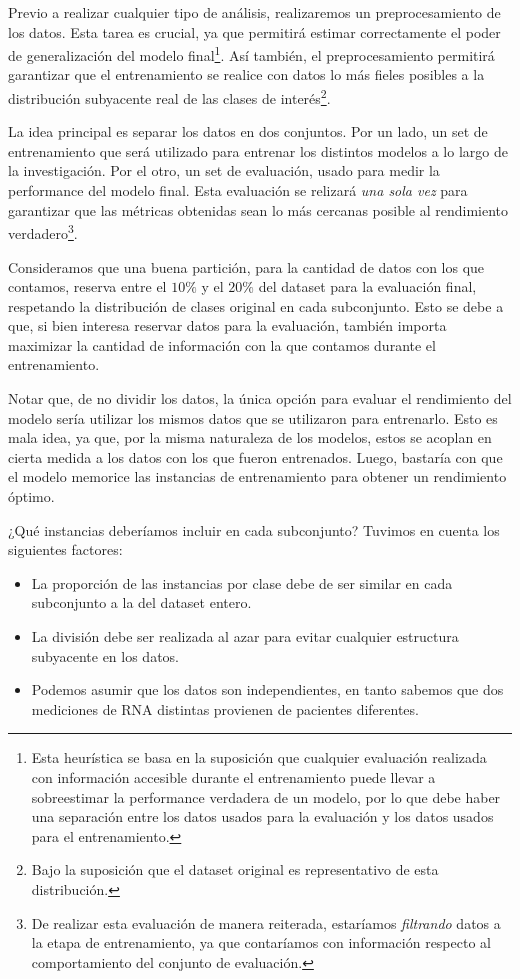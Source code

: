 Previo a realizar cualquier tipo de análisis, realizaremos un preprocesamiento de los datos. Esta tarea es crucial, ya que  permitirá estimar correctamente el poder de generalización del modelo final\footnote{Esta heurística se basa en la suposición que cualquier evaluación realizada con información accesible durante el entrenamiento puede llevar a sobreestimar la performance verdadera de un modelo, por lo que debe haber una separación entre los datos usados para la evaluación y los datos usados para el entrenamiento.}. Así también, el preprocesamiento permitirá garantizar que el entrenamiento se realice con datos lo más fieles posibles a la distribución subyacente real de las clases de interés\footnote{Bajo la suposición que el dataset original es representativo de esta distribución.}. 

La idea principal es separar los datos en dos conjuntos. Por un lado, un set de entrenamiento que será utilizado para entrenar los distintos modelos a lo largo de la investigación. Por el otro, un set de evaluación, usado para medir la performance del modelo final. Esta evaluación se relizará \textit{una sola vez} para garantizar que las métricas obtenidas sean lo más cercanas posible al rendimiento verdadero\footnote{De realizar esta evaluación de manera reiterada, estaríamos \textit{filtrando} datos a la etapa de entrenamiento, ya que contaríamos con información respecto al comportamiento del conjunto de evaluación.}.

Consideramos que una buena partición, para la cantidad de datos con los que contamos, reserva entre el $10\%$ y el $20\%$ del dataset para la evaluación final, respetando la distribución de clases original en cada subconjunto. Esto se debe a que, si bien interesa reservar datos para la evaluación, también importa maximizar la cantidad de información con la que contamos durante el entrenamiento.

Notar que, de no dividir los datos, la única opción para evaluar el rendimiento del modelo sería utilizar los mismos datos que se utilizaron para entrenarlo. Esto es mala idea, ya que, por la misma naturaleza de los modelos, estos se acoplan en cierta medida a los datos con los que fueron entrenados. Luego, bastaría con que el modelo memorice las instancias de entrenamiento para obtener un rendimiento óptimo.

¿Qué instancias deberíamos incluir en cada subconjunto? Tuvimos en cuenta los siguientes factores:

\begin{itemize}
    \item La proporción de las instancias por clase debe de ser similar en cada subconjunto a la del dataset entero.
    \item La división debe ser realizada al azar para evitar cualquier estructura subyacente en los datos.
    \item Podemos asumir que los datos son independientes, en tanto sabemos que dos mediciones de RNA distintas provienen de pacientes diferentes. 
\end{itemize}


